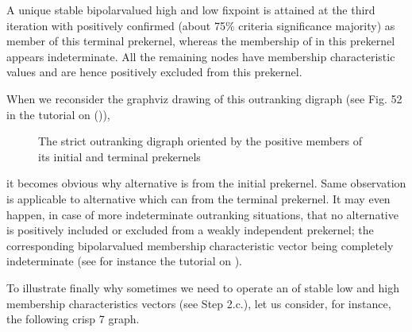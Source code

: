 \documentclass[a4paper,12pt,english]{sphinxhowto}
\let\sphinxpxdimen\pdfpxdimen\else\newdimen\sphinxpxdimen
\begin{document}
\sphinxAtStartPar
A unique stable bipolar\sphinxhyphen{}valued high and low fixpoint is attained at the third iteration with  positively confirmed (about 75\% criteria significance majority) as member of this terminal prekernel, whereas the membership of  in this prekernel appears indeterminate. All the remaining nodes have  membership characteristic values and are hence positively excluded from this prekernel.

\sphinxAtStartPar
When we reconsider the graphviz drawing of this outranking digraph (see Fig. 52  in the tutorial on {\hyperref[\detokenize{pearls:kernel-tutorial-label}]{}} ()),

\begin{figure}[H]
\centering
\capstart

\noindent\sphinxincludegraphics[width=300\sphinxpxdimen]{{bestWorstOrientation}.png}
\caption{The strict outranking digraph oriented by the positive members of its initial and terminal prekernels}\label{\detokenize{pearls:id106}}\end{figure}

\sphinxAtStartPar
it becomes obvious why alternative  is  from the initial prekernel. Same observation is applicable to alternative  which can  from the terminal prekernel. It may even happen, in case of more indeterminate outranking situations, that no alternative  is positively included or excluded from a weakly independent prekernel; the corresponding bipolar\sphinxhyphen{}valued membership characteristic vector being completely indeterminate (see for instance the tutorial on ).

\sphinxAtStartPar
To illustrate finally why sometimes we need to operate an  of  stable low and high membership characteristics vectors (see Step 2.c.), let us consider, for instance, the following crisp 7\sphinxhyphen{} graph.
\end{document}
